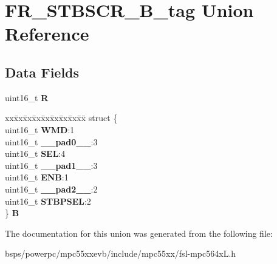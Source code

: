 \hypertarget{unionFR__STBSCR__16B__tag}{}\section{F\+R\+\_\+\+S\+T\+B\+S\+C\+R\+\_\+B\+\_\+tag Union Reference}
\label{unionFR__STBSCR__16B__tag}
\subsection*{Data Fields}
\begin{DoxyCompactItemize}
\item 
\mbox{\label{unionFR__STBSCR__16B__tag_ae08bce76d4559105c7f5f57b6126a746}} 
uint16\+\_\+t {\bfseries R}
\item 
\mbox{\label{unionFR__STBSCR__16B__tag_a44ab4835b875299edffaa25ac5343afb}} 
\begin{tabbing}
xx\=xx\=xx\=xx\=xx\=xx\=xx\=xx\=xx\=\kill
struct \{\\
\>uint16\_t {\bfseries WMD}:1\\
\>uint16\_t {\bfseries \_\_pad0\_\_}:3\\
\>uint16\_t {\bfseries SEL}:4\\
\>uint16\_t {\bfseries \_\_pad1\_\_}:3\\
\>uint16\_t {\bfseries ENB}:1\\
\>uint16\_t {\bfseries \_\_pad2\_\_}:2\\
\>uint16\_t {\bfseries STBPSEL}:2\\
\} {\bfseries B}\\

\end{tabbing}\end{DoxyCompactItemize}


The documentation for this union was generated from the following file\+:\begin{DoxyCompactItemize}
\item 
bsps/powerpc/mpc55xxevb/include/mpc55xx/fsl-\/mpc564x\+L.\+h\end{DoxyCompactItemize}
